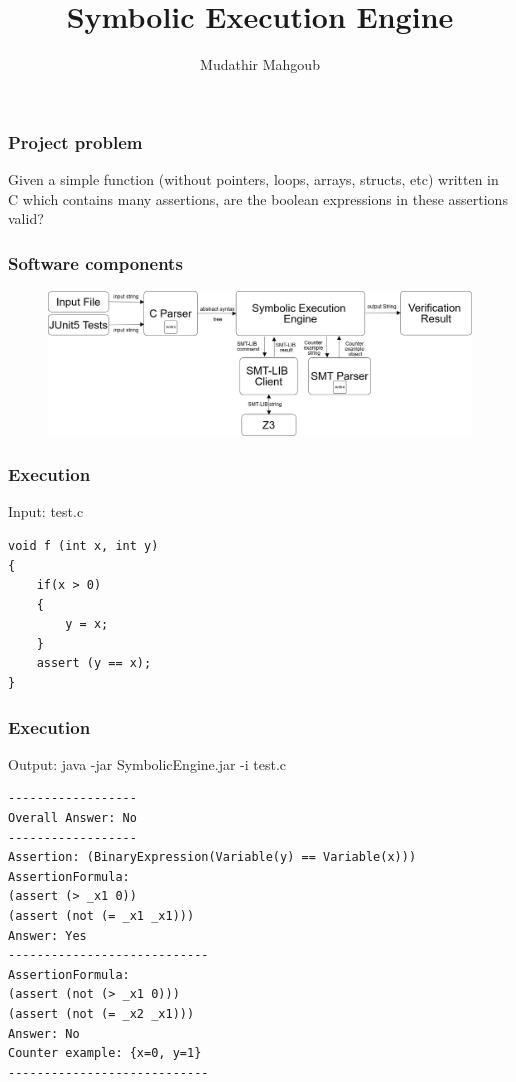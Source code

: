 \documentclass{beamer}
\title{Symbolic Execution Engine}
\author{Mudathir Mahgoub}
\begin{document}
 
\frame{\titlepage}
 
\begin{frame}
\frametitle{Project problem}
Given a simple function (without pointers, loops, arrays, structs, etc) written in C which contains many assertions, are the boolean expressions in these assertions valid?
\end{frame}

\begin{frame}
\frametitle{Software components}
\begin{figure}
 \centering
 \includegraphics[scale=.21,keepaspectratio=true]{./engine.png}
\end{figure}
\end{frame}


\begin{frame}[fragile]
\frametitle{Execution}
\scriptsize

\begin{block}{Input: test.c}
\begin{lstlisting}  
void f (int x, int y)
{
    if(x > 0)
    {
        y = x;
    }
    assert (y == x);
}
\end{lstlisting}
\end{block}
\end{frame}


\begin{frame}[fragile]
\frametitle{Execution}
\begin{block} {Output: java -jar SymbolicEngine.jar -i test.c}
\small
\begin{lstlisting} 
------------------
Overall Answer: No
------------------
Assertion: (BinaryExpression(Variable(y) == Variable(x)))
AssertionFormula:
(assert (> _x1 0))
(assert (not (= _x1 _x1)))
Answer: Yes
----------------------------
AssertionFormula:
(assert (not (> _x1 0)))
(assert (not (= _x2 _x1)))
Answer: No
Counter example: {x=0, y=1}
----------------------------
\end{lstlisting} 
\end{block}
\end{frame}
\end{document}
